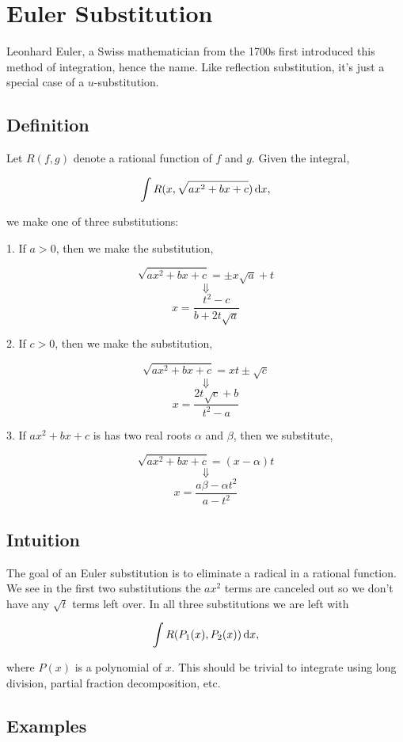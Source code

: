 \section{Euler Substitution} \label{sec:eulersubstitution}


Leonhard Euler, a Swiss mathematician from the 1700s first introduced this method of integration, hence the name. Like reflection substitution, it's just a special case of a $u$-substitution. 

\subsection*{Definition}

Let $R(f, g)$ denote a rational function of $f$ and $g$. Given the integral,

$$ \int R(x, \sqrt{ax^2+bx+c})\,\textrm{d}x, $$

\noindent we make one of three substitutions:

1. If $a>0$, then we make the substitution,

$$ \sqrt{ax^2 + bx + c} = \pm x\sqrt a + t $$
$$ \Downarrow $$
$$ x = \frac{t^2 - c}{b + 2t\sqrt a} $$

2. If $c>0$, then we make the substitution,

$$ \sqrt{ax^2 + bx + c} = xt \pm \sqrt{c} $$
$$ \Downarrow $$
$$ x = \frac{2t\sqrt c + b}{t^2-a} $$

3. If $ax^2 + bx + c$ is has two real roots $\alpha$ and $\beta$, then we substitute,

$$ \sqrt{ax^2 + bx + c} = (x-\alpha)t $$
$$ \Downarrow $$
$$ x = \frac{a\beta - \alpha t^2}{a-t^2} $$

\subsection*{Intuition}

The goal of an Euler substitution is to eliminate a radical in a rational function. We see in the first two substitutions the $ax^2$ terms are canceled out so we don't have any $\sqrt t$ terms left over. In all three substitutions we are left with

$$ \int R(P_1(x), P_2(x))\,\textrm{d}x, $$

\noindent where $P(x)$ is a polynomial of $x$. This should be trivial to integrate using long division, partial fraction decomposition, etc. 

\subsection*{Examples}

